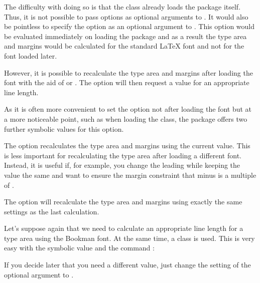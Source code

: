 \begin{Explain}
  The difficulty with doing so is that the {\KOMAScript} class already loads
  the  package itself. Thus, it is not possible to pass
  options as optional arguments to . It
  would also be pointless to specify the 
  option as an optional argument to .
  This option would be evaluated immediately on loading the 
  package and as a result the type area and margins would be calculated for the
  standard {\LaTeX} font and not for the font loaded later.

  However, it is possible to recalculate the type area and margins after
  loading the font with the aid of %
   or
  . The option
   will then request a  value for an appropriate line
  length.

  As it is often more convenient to set the  option not after
  loading the font but at a more noticeable point, such as when loading the
  class, the  package offers two further symbolic values for
  this option.
\end{Explain}

The option 
recalculates the type area and margins using the current  value. 
This is less important for recalculating the type area after loading a 
different font. Instead, it is useful if, for example, you change the
leading while keeping the  value the same and want to ensure the 
margin constraint that  minus  is a 
multiple of .

The option  will
recalculate the type area and margins using exactly the same settings as the
last calculation.

\begin{Example}
  Let's suppose again that we need to calculate an appropriate line length for
  a type area using the Bookman font. At the same time, a {\KOMAScript} class
  is used. This is very easy with the symbolic value  and the
  command :
If you decide later that you need a different  value, just change the
setting of the optional argument to .
\end{Example}

